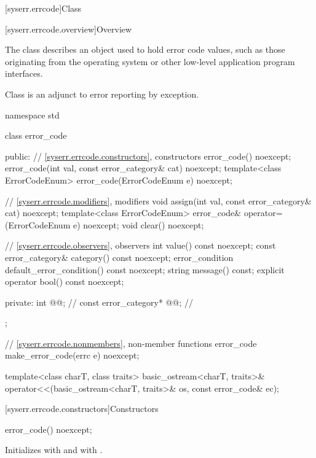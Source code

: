 [syserr.errcode]{Class }

[syserr.errcode.overview]{Overview}

\pnum
The class  describes an object used to hold error code
values, such as those originating from the operating system or other low-level
application program interfaces.
\begin{note}
Class  is an
adjunct to error reporting by exception.
\end{note}

%
\begin{codeblock}
namespace std {
  class error_code {
  public:
    // \ref{syserr.errcode.constructors}, constructors
    error_code() noexcept;
    error_code(int val, const error_category& cat) noexcept;
    template<class ErrorCodeEnum>
      error_code(ErrorCodeEnum e) noexcept;

    // \ref{syserr.errcode.modifiers}, modifiers
    void assign(int val, const error_category& cat) noexcept;
    template<class ErrorCodeEnum>
      error_code& operator=(ErrorCodeEnum e) noexcept;
    void clear() noexcept;

    // \ref{syserr.errcode.observers}, observers
    int value() const noexcept;
    const error_category& category() const noexcept;
    error_condition default_error_condition() const noexcept;
    string message() const;
    explicit operator bool() const noexcept;

  private:
    int @@;                   // \expos
    const error_category* @@; // \expos
  };

  // \ref{syserr.errcode.nonmembers}, non-member functions
  error_code make_error_code(errc e) noexcept;

  template<class charT, class traits>
    basic_ostream<charT, traits>&
      operator<<(basic_ostream<charT, traits>& os, const error_code& ec);
}
\end{codeblock}

[syserr.errcode.constructors]{Constructors}

%
\begin{itemdecl}
error_code() noexcept;
\end{itemdecl}

\begin{itemdescr}
\pnum
\effects
Initializes  with 
and  with .
\end{itemdescr}

